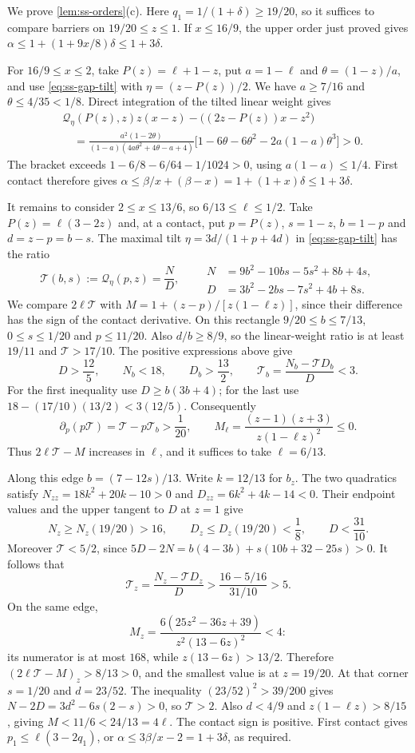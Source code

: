  We prove \cref{lem:ss-orders}(c).
Here $q_1=1/(1+\delta)\ge19/20$, so it suffices to compare barriers on $19/20\le z\le1$.
If $x\le16/9$, the upper order just proved gives
$\alpha\le1+(1+9x/8)\delta\le1+3\delta$.

For $16/9\le x\le2$, take $P(z)=\ell+1-z$, put $a=1-\ell$ and $\theta=(1-z)/a$,
and use \eqref{eq:ss-gap-tilt} with $\eta=(z-P(z))/2$.
We have $a\ge7/16$ and $\theta\le4/35<1/8$. Direct integration of the tilted linear weight gives
\begin{align*}
 &\mathcal Q_\eta(P(z),z)z(x-z)-\bigl((2z-P(z))x-z^2\bigr)\\
 &\quad=\frac{a^2(1-2\theta)}{(1-a)(4a\theta^2+4\theta-a+4)}
 \bigl[1-6\theta-6\theta^2-2a(1-a)\theta^3\bigr]>0.
\end{align*}
The bracket exceeds $1-6/8-6/64-1/1024>0$, using $a(1-a)\le1/4$.
First contact therefore gives $\alpha\le\beta/x+(\beta-x)=1+(1+x)\delta\le1+3\delta$.

It remains to consider $2\le x\le13/6$, so $6/13\le\ell\le1/2$.
Take $P(z)=\ell(3-2z)$ and, at a contact, put
$p=P(z)$, $s=1-z$, $b=1-p$ and $d=z-p=b-s$.
The maximal tilt $\eta=3d/(1+p+4d)$ in \eqref{eq:ss-gap-tilt} has the ratio
\[
 \mathcal T(b,s):=\mathcal Q_\eta(p,z)=\frac ND,\qquad
 \begin{aligned}
 N&=9b^2-10bs-5s^2+8b+4s,\\
 D&=3b^2-2bs-7s^2+4b+8s.
 \end{aligned}
\]
We compare $2\ell\mathcal T$ with
$M=1+(z-p)/[z(1-\ell z)]$, since their difference has the sign of the contact derivative.
On this rectangle $9/20\le b\le7/13$, $0\le s\le1/20$ and $p\le11/20$.
Also $d/b\ge8/9$, so the linear-weight ratio is at least $19/11$ and
$\mathcal T>17/10$. The positive expressions above give
\[
 D>\frac{12}{5},\qquad N_b<18,\qquad D_b>\frac{13}{2},\qquad
 \mathcal T_b=\frac{N_b-\mathcal T D_b}{D}<3.
\]
For the first inequality use $D\ge b(3b+4)$; for the last use
$18-(17/10)(13/2)<3(12/5)$. Consequently
\[
 \partial_p(p\mathcal T)=\mathcal T-p\mathcal T_b>\frac1{20},\qquad
 M_\ell=\frac{(z-1)(z+3)}{z(1-\ell z)^2}\le0.
\]
Thus $2\ell\mathcal T-M$ increases in $\ell$, and it suffices to take $\ell=6/13$.

Along this edge $b=(7-12s)/13$. Write $k=12/13$ for $b_z$.
The two quadratics satisfy
$N_{zz}=18k^2+20k-10>0$ and $D_{zz}=6k^2+4k-14<0$.
Their endpoint values and the upper tangent to $D$ at $z=1$ give
\[
 N_z\ge N_z(19/20)>16,\qquad
 D_z\le D_z(19/20)<\frac18,\qquad D<\frac{31}{10}.
\]
Moreover $\mathcal T<5/2$, since
$5D-2N=b(4-3b)+s(10b+32-25s)>0$.
It follows that
\[
 \mathcal T_z=\frac{N_z-\mathcal T D_z}{D}
 >\frac{16-5/16}{31/10}>5.
\]
On the same edge,
\[
 M_z=\frac{6(25z^2-36z+39)}{z^2(13-6z)^2}<4:
\]
its numerator is at most $168$, while $z(13-6z)>13/2$.
Therefore $(2\ell\mathcal T-M)_z>8/13>0$, and the smallest value is at $z=19/20$.
At that corner $s=1/20$ and $d=23/52$. The inequality
$(23/52)^2>39/200$ gives $N-2D=3d^2-6s(2-s)>0$, so $\mathcal T>2$.
Also $d<4/9$ and $z(1-\ell z)>8/15$, giving $M<11/6<24/13=4\ell$.
The contact sign is positive. First contact gives $p_1\le\ell(3-2q_1)$, or
$\alpha\le3\beta/x-2=1+3\delta$, as required.

